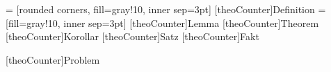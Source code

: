 \theoreminframepreskip{0pt}
\theoreminframepostskip{0pt}
\theoremframepreskip{0cm}
\theoremframepostskip{0cm}
 = [rounded corners, fill=gray!10, inner sep=3pt]
\newcommand\thmbox[1]{%
	\noindent\begin{tikzpicture}%
	\node [thmbox] (box){%
		\begin{minipage}{1.00\textwidth}%
		#1%
		\end{minipage}%
	};%
	\end{tikzpicture}}
\let\theoremframecommand\thmbox
{}[theoCounter]{Definition}
 = [fill=gray!10, inner sep=3pt]
\newcommand\thmboxx[1]{%
	\noindent\begin{tikzpicture}%
	\node [thmboxx] (box){%
		\begin{minipage}{1.00\textwidth}%
		#1%
		\end{minipage}%
	};%
	\end{tikzpicture}}
\let\theoremframecommand\thmboxx
{}[theoCounter]{Lemma}
[theoCounter]{Theorem}
[theoCounter]{Korollar}
[theoCounter]{Satz}
[theoCounter]{Fakt}
\newtheorem{example}[exmpCounter]{Beispiel}

\theoremstyle{breakSCHeader}
\theoremheaderfont{\bfseries\scshape}
[theoCounter]{Problem}

\theoremstyle{breakNormalHeader}
\theoremheaderfont{\normalfont}\theorembodyfont{\upshape}
\theoremstyle{nonumberplain}
\theoremsymbol{\rule{1ex}{1ex}}
\newtheorem{proof}{Beweis}

\renewcommand{\theequation}{\arabic{chapter}.\arabic{equation}}

\setlength\abovedisplayshortskip{0pt}
\setlength\belowdisplayshortskip{0pt}
\setlength\abovedisplayskip{2pt}
\setlength\belowdisplayskip{2pt}